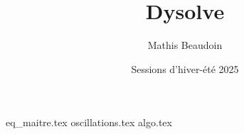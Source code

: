 \documentclass{article}
\title{\textbf{Dysolve}}
\author{Mathis Beaudoin}
\date{Sessions d'hiver-été 2025}
\numberwithin{equation}{section}
\begin{document}

\maketitle
\clearpage

\tableofcontents
\clearpage


\newpage
{}
\setcounter{page}{1}

{eq_maitre.tex}
{oscillations.tex}
{algo.tex}



\newpage
 
 
\end{document}
